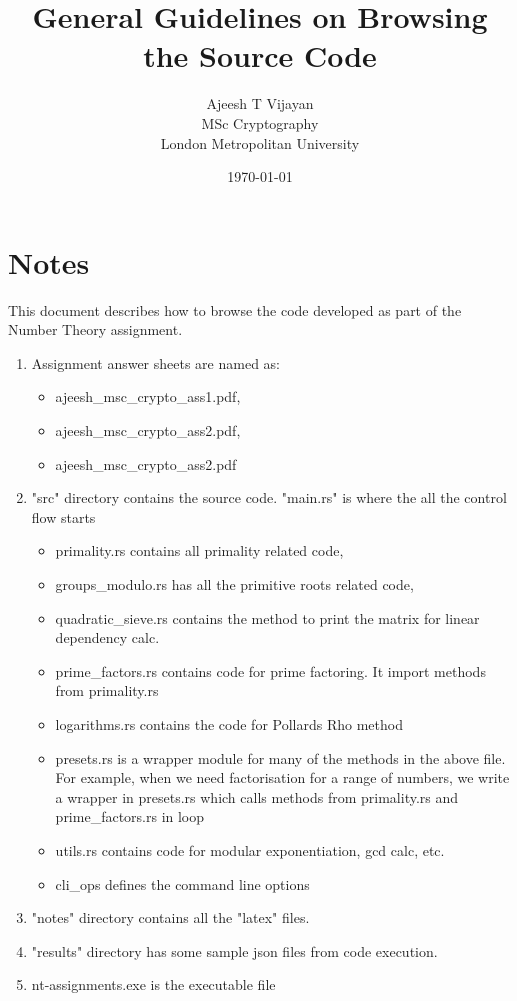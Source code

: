 \documentclass{article}
\title{General Guidelines on Browsing the Source Code}
\author{Ajeesh T Vijayan  \\
   MSc Cryptography  \\
   London Metropolitan University
}
\date{\today}
\begin{document}
    \maketitle

    \section*{Notes}
    This document describes how to browse the code developed as part of the
    Number Theory assignment.

    \begin{enumerate}
        \item Assignment answer sheets are named as:
            \begin{itemize}
                \item ajeesh\_msc\_crypto\_ass1.pdf,
                \item ajeesh\_msc\_crypto\_ass2.pdf,
                \item ajeesh\_msc\_crypto\_ass2.pdf
            \end{itemize}
        \item "src" directory contains the source code. "main.rs" is where the all the control flow starts
            \begin{itemize}
                \item primality.rs contains all primality related code,
                \item groups\_modulo.rs has all the primitive roots related code,
                \item quadratic\_sieve.rs contains the method to print the matrix for linear dependency calc.
                \item prime\_factors.rs contains code for prime factoring. It import methods from primality.rs
                \item logarithms.rs contains the code for Pollards Rho method
                \item presets.rs is a wrapper module for many of the methods in the above file. For example, when we need factorisation for a range of numbers, we write a wrapper in presets.rs which calls methods from primality.rs and prime\_factors.rs in loop
                \item utils.rs contains code for modular exponentiation, gcd calc, etc.
                \item cli\_ops defines the command line options
            \end{itemize}
        \item "notes" directory contains all the "latex" files.
        \item "results" directory has some sample json files from code execution.
        \item nt-assignments.exe is the executable file
    \end{enumerate}
\end{document}
